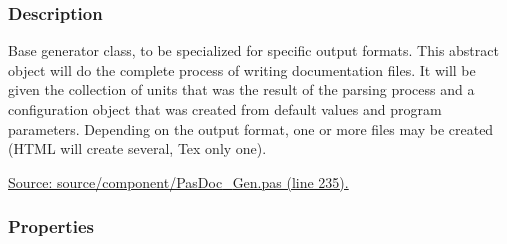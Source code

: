 \documentclass{report}
\begin{document}
\subsubsection*{\large{\textbf{Description}}\normalsize\hspace{1ex}\hfill}
Base generator class, to be specialized for specific output formats. This abstract object will do the complete process of writing documentation files. It will be given the collection of units that was the result of the parsing process and a configuration object that was created from default values and program parameters. Depending on the output format, one or more files may be created (HTML will create several, Tex only one).\par
\href{https://github.com/pasdoc/pasdoc/blob/master/source/component/PasDoc_Gen.pas#L235}{Source: source/component/PasDoc{\_}Gen.pas (line 235).}\subsubsection*{\large{\textbf{Properties}}\normalsize\hspace{1ex}\hfill}
\end{document}

